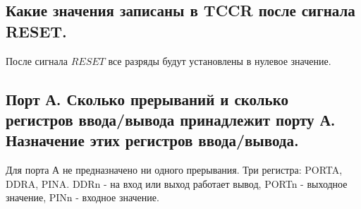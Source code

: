 \subsection{Какие значения записаны в TCCR после сигнала RESET.}
После сигнала $RESET$ все разряды будут установлены в нулевое значение.

\subsection{Порт А. Сколько прерываний и сколько регистров ввода/вывода принадлежит порту А. Назначение этих регистров ввода/вывода.}

Для порта А не предназначено ни одного прерывания. Три регистра: PORTA, DDRA, PINA.
DDRn - на вход или выход работает вывод, PORTn - выходное значение, PINn - входное значение.


